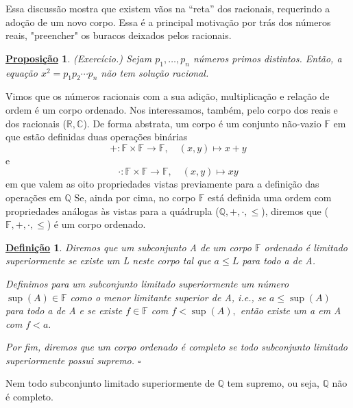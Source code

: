\documentclass{article}
\newtheorem*{def*}{\underline{Defini\c c\~ao}}
\newtheorem*{prop*}{\underline{Proposi\c c\~ao}}
\begin{document}
  Essa discuss\~ao mostra que existem v\~aos na ``reta'' dos racionais, requerindo a ado\c c\~ao de um novo corpo. Essa \'e a principal
motiva\c c\~ao por tr\'as dos n\'umeros reais, "preencher" os buracos deixados pelos racionais.
\begin{prop*}
  (Exerc\'icio.) Sejam $p_{1}, \ldots, p_{n}$ n\'umeros primos distintos. Ent\~ao, a equa\c c\~ao $x^{2} = p_{1}p_2\cdots p_{n}$ n\~ao
tem solu\c c\~ao racional.
\end{prop*}
  Vimos que os n\'umeros racionais com a sua adi\c c\~ao, multiplica\c c\~ao e rela\c c\~ao de ordem \'e um corpo ordenado. Nos interessamos,
tamb\'em, pelo corpo dos reais e dos racionais ($\mathbb{R}, \mathbb{C}$). De forma abstrata, um corpo \'e um conjunto n\~ao-vazio
 $\mathbb{F}$ em que est\~ao definidas duas opera\c c\~oes bin\'arias
 $$
    +:\mathbb{F}\times \mathbb{F}\rightarrow \mathbb{F}, \quad (x, y)\mapsto x + y
 $$
 e 
 $$
    \cdot: \mathbb{F}\times \mathbb{F}\rightarrow \mathbb{F}, \quad (x, y)\mapsto xy
 $$
 em que valem as oito propriedades vistas previamente para a defini\c c\~ao das opera\c c\~oes em $\mathbb{Q}$
 Se, ainda por cima, no corpo $\mathbb{F}$ est\'a definida uma ordem com propriedades an\'alogas \`as vistas para a qu\'adrupla
($\mathbb{Q}, +, \cdot, \leq{}$), diremos que ($\mathbb{F}, +, \cdot, \leq{}$) \'e um corpo ordenado.
\begin{def*}
  Diremos que um subconjunto A de um corpo $\mathbb{F}$ ordenado \'e limitado superiormente se existe um L neste corpo tal que $a \leq{L}$ para todo
a de A. 

  Definimos para um subconjunto limitado superiormente um n\'umero $\sup(A)\in \mathbb{F}$ como o menor limitante superior de
A, i.e., se $a \leq{\sup(A)}$ para todo a de A e se existe $f\in \mathbb{F}$ com $f < \sup(A),$ ent\~ao existe um a em A com $ f < a.$

  Por fim, diremos que um corpo ordenado \'e completo se todo subconjunto limitado superiormente possui supremo. $\square$
\end{def*}
  Nem todo subconjunto limitado superiormente de $\mathbb{Q}$ tem supremo, ou seja, $\mathbb{Q}$ n\~ao \'e completo.
\end{document}
